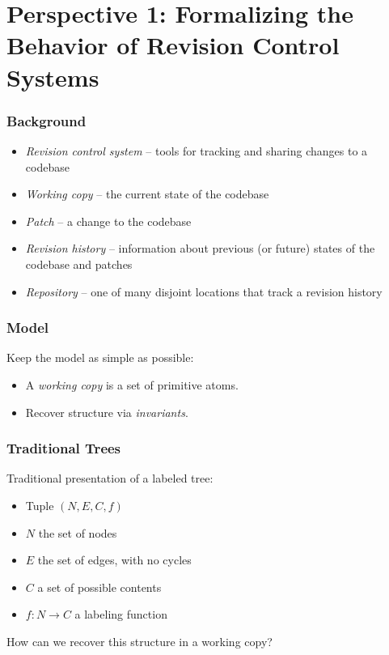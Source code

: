 \documentclass{beamer}
\begin{document}
\section{Perspective 1: Formalizing the Behavior of Revision Control Systems}

\begin{frame}
    \frametitle{Background}
    \begin{itemize}
        \item \emph{Revision control system} -- tools for tracking and
            sharing changes to a codebase
        \item \emph{Working copy} -- the current state of the codebase
        \item \emph{Patch} -- a change to the codebase
        \item \emph{Revision history} -- information about previous (or
            future) states of the codebase and patches
        \item \emph{Repository} -- one of many disjoint locations that track
            a revision history
    \end{itemize}
\end{frame}

\begin{frame}
    \frametitle{Model}
    Keep the model as simple as possible:
    \begin{itemize}
        \item A \emph{working copy} is a set of primitive atoms.
        \item Recover structure via \emph{invariants}.
    \end{itemize}
\end{frame}

\begin{frame}
    \frametitle{Traditional Trees}
    Traditional presentation of a labeled tree:
    \begin{itemize}
        \item Tuple $(N,E,C,f)$
        \item $N$ the set of nodes
        \item $E$ the set of edges, with no cycles
        \item $C$ a set of possible contents
        \item $f : N \to C$ a labeling function
    \end{itemize}
    How can we recover this structure in a working copy?
\end{frame}
\end{document}
